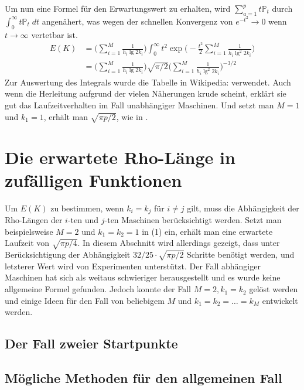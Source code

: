 \documentclass[a4paper, 10pt, ngerman]{article}
\begin{document}
Um nun eine Formel für den Erwartungswert zu erhalten, wird $\sum_{a = 1}^p t \mathbb{P}_t$ durch $\int_{0}^\infty t \mathbb{P}_t \; dt$ angenähert, was wegen der schnellen Konvergenz von $e^{-t^2} \to 0$ wenn $t \to \infty$ vertetbar ist.
\begin{align}
    E(K)
     & = \Bigg ( \sum_{i = 1}^M \frac 1 {h_i \lg 2k_i} \Bigg ) \int_{0}^{\infty} t^2 \exp \Bigg (- \frac {t^2} 2 \sum_{i = 1}^M \frac 1 {h_i \lg^2 2k_i} \Bigg ) \nonumber \\
     & = \Bigg ( \sum_{i = 1}^M \frac 1 {h_i \lg 2k_i} \Bigg ) \sqrt {\pi/2} \Bigg (\sum_{i = 1}^M \frac 1 {h_i \lg^2 2k_i} \Bigg )^{-3/2}
\end{align}
Zur Auswertung des Integrals wurde die Tabelle in Wikipedia: \cite{gint} verwendet. Auch wenn die Herleitung aufgrund der vielen Näherungen krude scheint, erklärt sie gut das Laufzeitverhalten im Fall unabhängiger Maschinen. Und setzt man $M = 1$ und $k_1 = 1$, erhält man $\sqrt{\pi p / 2}$, wie in \cite{pol75}.

\section{Die erwartete Rho-Länge in zufälligen Funktionen}

Um $E(K)$ zu bestimmen, wenn $k_i = k_j$ für $i \ne j$ gilt, muss die Abhängigkeit der Rho-Längen der $i$-ten und $j$-ten Maschinen berücksichtigt werden. Setzt man beispielsweise $M = 2$ und $k_1 = k_2 = 1$ in (1) ein, erhält man eine erwartete Laufzeit von $\sqrt {\pi p / 4}$. In diesem Abschnitt wird allerdings gezeigt, dass unter Berücksichtigung der Abhängigkeit $32/25 \cdot \sqrt{\pi p / 2}$ Schritte benötigt werden, und letzterer Wert wird von Experimenten unterstützt. Der Fall abhängiger Maschinen hat sich als weitaus schwieriger herausgestellt und es wurde keine allgemeine Formel gefunden. Jedoch konnte der Fall $M = 2, k_1 = k_2$ gelöst werden und einige Ideen für den Fall von beliebigem $M$ und $k_1 = k_2 = \dots = k_M$ entwickelt werden.

\subsection{Der Fall zweier Startpunkte}

\subsection{Mögliche Methoden für den allgemeinen Fall}
\end{document}
